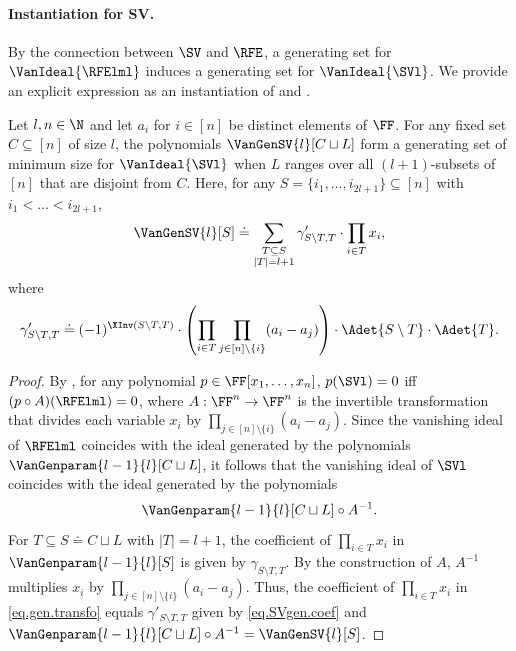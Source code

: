 \paragraph{Instantiation for SV.}
By the connection between $\SV$ and $\RFE$, a generating set for $\VanIdeal{\RFElml}$ induces a generating set for $\VanIdeal{\SVl}$. We provide an explicit expression as an instantiation of  and . 

\begin{corollary}\label{cor-gen-sv}
 Let $l, n \in \N$ and let $a_i$ for $i \in [n]$ be distinct elements of $\FF$.
 For any fixed set $C \subseteq [n]$ of size $l$, the polynomials $\VanGenSV{l}[C \sqcup L]$ form a generating set
 of minimum size for $\VanIdeal{\SVl}$ when $L$ ranges over all $(l+1)$-subsets of $[n]$ that are disjoint from $C$. Here, for any $S = \{i_1, \dots, i_{2l+1}\} \subseteq [n]$ with $i_1 < \dots < i_{2l+1}$,
 \[
 \VanGenSV{l}[S] \doteq \sum_{\substack{T \subseteq S \\ |T|=l+1}} \gamma'_{S \setminus T,T} \cdot \prod_{i \in
 T} x_i,
 \]
 where
 \begin{equation}\label{eq.SVgen.coef}
 \gamma'_{S \setminus T,T} \doteq (-1)^{\XInv(S \setminus T,T)} \cdot \left(\prod_{i \in T}\prod_{j \in [n]\setminus \{i\}} (a_i-a_{j})\right) \cdot 
 \Adet{S\setminus T} \cdot \Adet{T}.
\end{equation}
\end{corollary}

\begin{proof}
By , for any polynomial \(p\in\FF[x_1,\ldots,x_n]\), \(p(\SVl) = 0\) iff \((p\circ A)(\RFElml) = 0\), where $A:\FF^n\to \FF^n$ is the invertible transformation that divides each variable $x_i$ by $\prod_{j\in [n]\setminus \{i\}} (a_i-a_j)$. Since the vanishing ideal of $\RFElml$ coincides with the ideal generated by the polynomials $\VanGenparam{l-1}{l}[C \sqcup L]$, it follows that the vanishing ideal of $\SVl$ coincides with the ideal generated by the polynomials 
\begin{equation}\label{eq.gen.transfo}
\VanGenparam{l-1}{l}[C \sqcup L] \circ A^{-1}.
\end{equation} 
For $T \subseteq S \doteq C \sqcup L$ with $|T|=l+1$, the coefficient of $\prod_{i \in T} x_i$ in $\VanGenparam{l-1}{l}[S]$ is given by $\gamma_{S \setminus T, T}$. By the construction of $A$, $A^{-1}$ multiplies $x_i$ by $\prod_{j\in [n]\setminus \{i\}} (a_i-a_j)$. Thus, the coefficient of $\prod_{i \in T} x_i$ in \eqref{eq.gen.transfo} equals $\gamma'_{S\setminus T, T}$ given by \eqref{eq.SVgen.coef} and 
$\VanGenparam{l-1}{l}[C \sqcup L] \circ A^{-1} = \VanGenSV{l}[S]$.
\end{proof}

